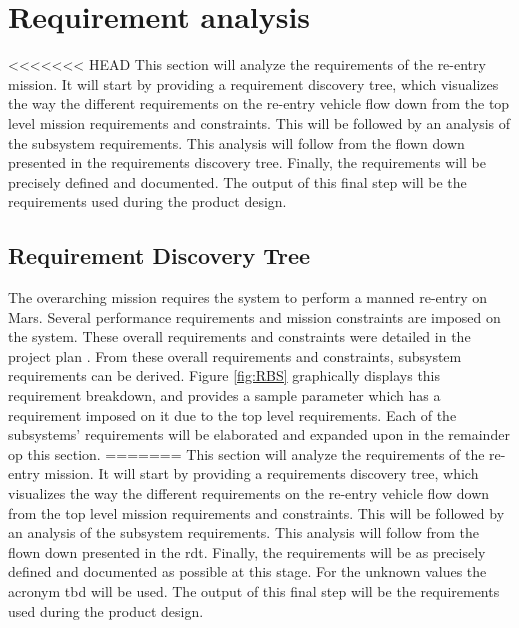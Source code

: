 \section{Requirement analysis} \label{ch:req}
<<<<<<< HEAD
This section will analyze the requirements of the re-entry mission. It will start by providing a requirement discovery tree, which visualizes the way the different requirements on the re-entry vehicle flow down from the top level mission requirements and constraints. This will be followed by an analysis of the subsystem requirements. This analysis will follow from the flown down presented in the requirements discovery tree. Finally, the requirements will be precisely defined and documented. The output of this final step will be the requirements used during the product design. %

\subsection{Requirement Discovery Tree}
The overarching mission requires the system to perform a manned re-entry on Mars. Several performance requirements and mission constraints are imposed on the system. These overall requirements and constraints were detailed in the project plan \cite{Balasooriyan2015}. From these overall requirements and constraints, subsystem requirements can be derived. Figure \ref{fig:RBS} graphically displays this requirement breakdown, and provides a sample parameter which has a requirement imposed on it due to the top level requirements. Each of the subsystems' requirements will be elaborated and expanded upon in the remainder op this section. 
=======
This section will analyze the requirements of the re-entry mission. It will start by providing a requirements discovery tree, which visualizes the way the different requirements on the re-entry vehicle flow down from the top level mission requirements and constraints. This will be followed by an analysis of the subsystem requirements. This analysis will follow from the flown down presented in the \gls{rdt}. Finally, the requirements will be as precisely defined and documented as possible at this stage. For the unknown values the acronym \gls{tbd} will be used. The output of this final step will be the requirements used during the product design. %

